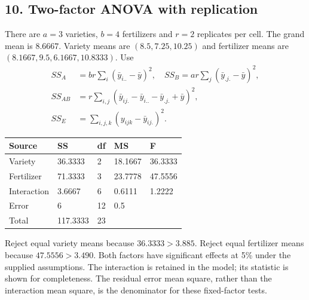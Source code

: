 \documentclass[11pt,a4paper]{article}
\begin{document}
\noindent\begin{minipage}{\linewidth}\subsection*{10. Two-factor ANOVA with replication}

There are $a=3$ varieties, $b=4$ fertilizers and $r=2$ replicates per cell. The grand mean is $8.6667$. Variety means are $(8.5,7.25,10.25)$ and fertilizer means are $(8.1667,9.5,6.1667,10.8333)$.
Use
\begin{align*}
SS_A&=br\sum_i(\bar y_{i..}-\bar y)^2,\quad
SS_B=ar\sum_j(\bar y_{.j.}-\bar y)^2,\\
SS_{AB}&=r\sum_{i,j}(\bar y_{ij.}-\bar y_{i..}-\bar y_{.j.}+\bar y)^2,\\
SS_E&=\sum_{i,j,k}(y_{ijk}-\bar y_{ij.})^2.
\end{align*}
\begin{center}\renewcommand{\arraystretch}{1.2}\begin{tabular}{lllll}\hline Source & SS & df & MS & F\\\hline
Variety & 36.3333 & 2 & 18.1667 & 36.3333\\
Fertilizer & 71.3333 & 3 & 23.7778 & 47.5556\\
Interaction & 3.6667 & 6 & 0.6111 & 1.2222\\
Error & 6 & 12 & 0.5 & \\
Total & 117.3333 & 23 &  & \\\hline\end{tabular}\end{center}
Reject equal variety means because $36.3333>3.885$. Reject equal fertilizer means because $47.5556>3.490$. Both factors have significant effects at 5\% under the supplied assumptions. The interaction is retained in the model; its statistic is shown for completeness. The residual error mean square, rather than the interaction mean square, is the denominator for these fixed-factor tests.
\end{minipage}\par\medskip
\end{document}
